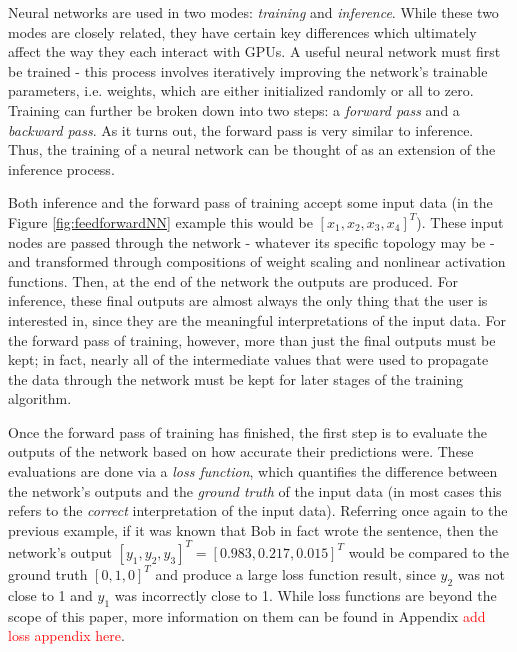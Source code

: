 \documentclass[12pt,letterpaper]{article}
\newcommand\myworries[1]{\textcolor{red}{#1}}
\begin{document}
Neural networks are used in two modes: \textit{training} and \textit{inference}. While these two modes are closely related, they have certain key differences which ultimately affect the way they each interact with GPUs. A useful neural network must first be trained - this process involves iteratively improving the network's trainable parameters, i.e. weights, which are either initialized randomly or all to zero. Training can further be broken down into two steps: a \textit{forward pass} and a \textit{backward pass}. As it turns out, the forward pass is very similar to inference. Thus, the training of a neural network can be thought of as an extension of the inference process.
\par 

Both inference and the forward pass of training accept some input data (in the Figure \ref{fig:feedforwardNN} example this would be $[x_1,x_2,x_3,x_4]^T$). These input nodes are passed through the network - whatever its specific topology may be - and transformed through compositions of weight scaling and nonlinear activation functions. Then, at the end of the network the outputs are produced. For inference, these final outputs are almost always the only thing that the user is interested in, since they are the meaningful interpretations of the input data. For the forward pass of training, however, more than just the final outputs must be kept; in fact, nearly all of the intermediate values that were used to propagate the data through the network must be kept for later stages of the training algorithm.
\par

Once the forward pass of training has finished, the first step is to evaluate the outputs of the network based on how accurate their predictions were. These evaluations are done via a \textit{loss function}, which quantifies the difference between the network's outputs and the \textit{ground truth} of the input data (in most cases this refers to the \textit{correct} interpretation of the input data). Referring once again to the previous example, if it was known that Bob in fact wrote the sentence, then the network's output $[y_1,y_2,y_3]^T = [0.983,0.217,0.015]^T$ would be compared to the ground truth $[0,1,0]^T$ and produce a large loss function result, since $y_2$ was not close to 1 and $y_1$ was incorrectly close to 1. While loss functions are beyond the scope of this paper, more information on them can be found in Appendix \myworries{add loss appendix here}.
\par
\end{document}
